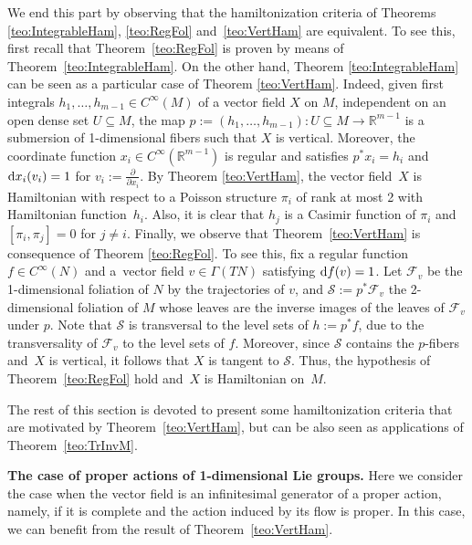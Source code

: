 \documentclass[10pt,a4paper]{amsart}
\newcommand{\R}[1]{\mathbb{R}^{#1}}
\newcommand{\dd}{{\rm d}}
\numberwithin{equation}{section}
\begin{document}
We end this part by observing that the hamiltonization criteria of Theorems \ref{teo:IntegrableHam}, \ref{teo:RegFol} and~\ref{teo:VertHam} are equivalent. To see this, first recall that Theorem~\ref{teo:RegFol} is proven by means of Theorem~\ref{teo:IntegrableHam}. On the other hand, Theorem \ref{teo:IntegrableHam} can be seen as a particular case of Theorem \ref{teo:VertHam}. Indeed, given first integrals $h_1,\dots,h_{m-1}\in C^{\infty}(M)$ of a vector field $X$ on $M$, independent on an open dense set $U\subseteq M$, the map $p:=(h_1,\dots,h_{m-1})\colon U\subseteq M \to \R{m-1}$ is a submersion of 1-dimensional fibers such that $X$ is vertical. Moreover, the coordinate function $x_i\in C^{\infty}(\R{m-1})$ is regular and satisfies $p^*x_{i}=h_i$ and $\dd x_{i}(v_{i})=1$ for $v_i:=\frac{\partial}{\partial x_{i}}$. By Theorem \ref{teo:VertHam}, the vector field~$X$ is Hamiltonian with respect to a Poisson structure $\pi_{i}$ of rank at most 2 with Hamiltonian function~$h_{i}$. Also, it is clear that $h_{j}$ is a Casimir function of $\pi_i$ and $[\pi_{i},\pi_{j}]=0$ for $j\neq i$. Finally, we observe that Theorem~\ref{teo:VertHam} is consequence of Theorem \ref{teo:RegFol}. To see this, fix a regular function $f\in C^{\infty}(N)$ and a~vector field $v\in\Gamma(TN)$ satisfying $\dd f(v)=1$. Let $\mathcal{F}_{v}$ be the 1-dimensional foliation of $N$ by the trajectories of $v$, and $\mathcal{S}:=p^{*}\mathcal{F}_{v}$ the 2-dimensional foliation of $M$ whose leaves are the inverse images of the leaves of $\mathcal{F}_{v}$ under $p$. Note that $\mathcal{S}$ is transversal to the level sets of $h:=p^{*}f$, due to the transversality of $\mathcal{F}_{v}$ to the level sets of $f$. Moreover, since $\mathcal{S}$ contains the $p$-fibers and~$X$ is vertical, it follows that $X$ is tangent to $\mathcal{S}$. Thus, the hypothesis of Theorem~\ref{teo:RegFol} hold and~$X$ is Hamiltonian on~$M$.

The rest of this section is devoted to present some hamiltonization criteria that are motivated by Theorem~\ref{teo:VertHam}, but can be also seen as applications of Theorem~\ref{teo:TrInvM}.

{\bf The case of proper actions of 1-dimensional Lie groups.} Here we consider the case when the vector field is an infinitesimal generator of a proper action, namely, if it is complete and the action induced by its flow is proper. In this case, we can benefit from the result of Theorem~\ref{teo:VertHam}.
\end{document}
